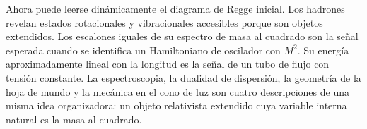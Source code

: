 \begin{classroomqa}
\end{classroomqa}

Ahora puede leerse dinámicamente el diagrama de Regge inicial. Los hadrones revelan estados rotacionales y vibracionales accesibles porque son objetos extendidos. Los escalones iguales de su espectro de masa al cuadrado son la señal esperada cuando se identifica un Hamiltoniano de oscilador con \(M^2\). Su energía aproximadamente lineal con la longitud es la señal de un tubo de flujo con tensión constante. La espectroscopia, la dualidad de dispersión, la geometría de la hoja de mundo y la mecánica en el cono de luz son cuatro descripciones de una misma idea organizadora: un objeto relativista extendido cuya variable interna natural es la masa al cuadrado.
